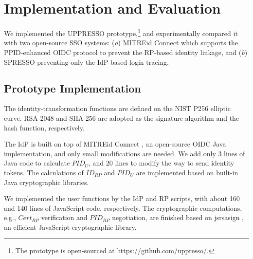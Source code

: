 \section{Implementation and Evaluation}
\label{sec:implementation}
We implemented the UPPRESSO prototype,\footnote{The prototype is open-sourced at https://github.com/uppresso/.}
 and experimentally compared it
 with two open-source SSO systems:
  (\emph{a}) MITREid Connect \cite{MITREid}
    which supports the PPID-enhanced OIDC protocol to prevent the RP-based identity linkage,
     and (\emph{b}) SPRESSO \cite{SPRESSO} preventing only the IdP-based login tracing.


\subsection{Prototype Implementation}
\label{subsec:proto-imple}
The identity-transformation functions are defined on
        the NIST P256 elliptic curve.
RSA-2048 and SHA-256 are adopted as the signature algorithm and the hash function, respectively.

The IdP is built on top of MITREid Connect \cite{MITREid},
    an open-source OIDC Java implementation, %
    and only small modifications are needed.
We add only 3 lines of Java code to calculate $PID_U$,
    and 20 lines to modify the way to send identity tokens.
The calculations of $ID_{RP}$ and $PID_U$ are implemented based on built-in Java cryptographic libraries.

We implemented the user functions by the IdP and RP scripts,
     with about 160 and 140 lines of JavaScript code, respectively.
The cryptographic computations, e.g., $Cert_{RP}$ verification and $PID_{RP}$ negotiation, are finished based on jsrsasign \cite{jsrsasign}, an efficient JavaScript cryptographic library.

